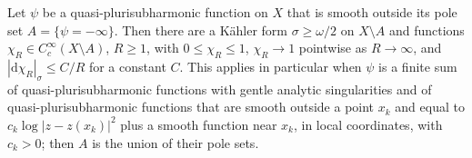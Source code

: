 \begin{lemma}\label{lem:analytic-complement-cutoffs}
Let $\psi$ be a quasi-plurisubharmonic function on $X$ that is smooth outside its pole set $A=\{\psi=-\infty\}$. Then there are a K\"ahler form $\sigma\geq\omega/2$ on $X\setminus A$ and functions $\chi_R\in C^\infty_c(X\setminus A)$, $R\geq1$, with $0\leq\chi_R\leq1$, $\chi_R\to1$ pointwise as $R\to\infty$, and $|\mathrm d\chi_R|_\sigma\leq C/R$ for a constant $C$. This applies in particular when $\psi$ is a finite sum of quasi-plurisubharmonic functions with gentle analytic singularities and of quasi-plurisubharmonic functions that are smooth outside a point $x_k$ and equal to $c_k\log|z-z(x_k)|^2$ plus a smooth function near $x_k$, in local coordinates, with $c_k>0$; then $A$ is the union of their pole sets.
\end{lemma}
